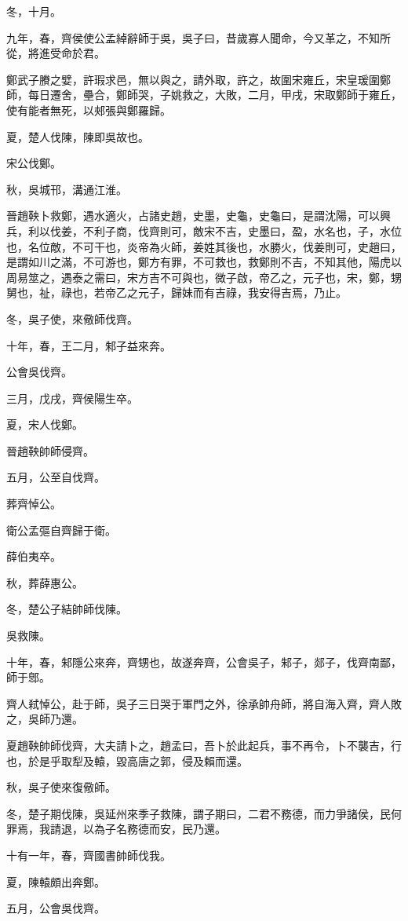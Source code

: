 \begin{pinyinscope}
冬，十月。

九年，春，齊侯使公孟綽辭師于吳，吳子曰，昔歲寡人聞命，今又革之，不知所從，將進受命於君。

鄭武子賸之嬖，許瑕求邑，無以與之，請外取，許之，故圍宋雍丘，宋皇瑗圍鄭師，每日遷舍，壘合，鄭師哭，子姚救之，大敗，二月，甲戌，宋取鄭師于雍丘，使有能者無死，以郟張與鄭羅歸。

夏，楚人伐陳，陳即吳故也。

宋公伐鄭。

秋，吳城邗，溝通江淮。

晉趙鞅卜救鄭，遇水適火，占諸史趙，史墨，史龜，史龜曰，是謂沈陽，可以興兵，利以伐姜，不利子商，伐齊則可，敵宋不吉，史墨曰，盈，水名也，子，水位也，名位敵，不可干也，炎帝為火師，姜姓其後也，水勝火，伐姜則可，史趙曰，是謂如川之滿，不可游也，鄭方有罪，不可救也，救鄭則不吉，不知其他，陽虎以周易筮之，遇泰之需曰，宋方吉不可與也，微子啟，帝乙之，元子也，宋，鄭，甥舅也，祉，祿也，若帝乙之元子，歸妹而有吉祿，我安得吉焉，乃止。

冬，吳子使，來儆師伐齊。

十年，春，王二月，邾子益來奔。

公會吳伐齊。

三月，戊戌，齊侯陽生卒。

夏，宋人伐鄭。

晉趙鞅帥師侵齊。

五月，公至自伐齊。

葬齊悼公。

衛公孟彄自齊歸于衛。

薛伯夷卒。

秋，葬薛惠公。

冬，楚公子結帥師伐陳。

吳救陳。

十年，春，邾隱公來奔，齊甥也，故遂奔齊，公會吳子，邾子，郯子，伐齊南鄙，師于鄎。

齊人弒悼公，赴于師，吳子三日哭于軍門之外，徐承帥舟師，將自海入齊，齊人敗之，吳師乃還。

夏趙鞅帥師伐齊，大夫請卜之，趙孟曰，吾卜於此起兵，事不再令，卜不襲吉，行也，於是乎取犁及轅，毀高唐之郭，侵及賴而還。

秋，吳子使來復儆師。

冬，楚子期伐陳，吳延州來季子救陳，謂子期曰，二君不務德，而力爭諸侯，民何罪焉，我請退，以為子名務德而安，民乃還。

十有一年，春，齊國書帥師伐我。

夏，陳轅頗出奔鄭。

五月，公會吳伐齊。


\end{pinyinscope}
